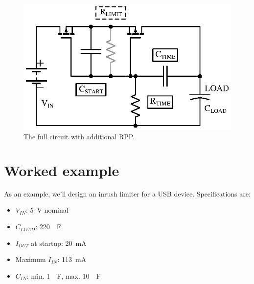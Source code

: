 \documentclass[letterpaper,12pt]{article}
\begin{document}
\begin{figure}[H]
\centering
\includegraphics{with_rpp}
\caption{The full circuit with additional RPP.}
\end{figure}

\section{Worked example}
\label{sec:example}

As an example, we'll design an inrush limiter for a USB device. Specifications are:

\begin{itemize}
\item{$V_{IN}$: \SI{5}{V} nominal}
\item{$C_{LOAD}$: \SI{220}{\mu F}}
\item{$I_{OUT}$ at startup: \SI{20}{mA}}
\item{Maximum $I_{IN}$: \SI{113}{mA} \cite{usb2}}
\item{$C_{IN}$: min. \SI{1}{\mu F}, max. \SI{10}{\mu F} \cite{usb2}}
\end{itemize}

\hrulefill
\end{document}
